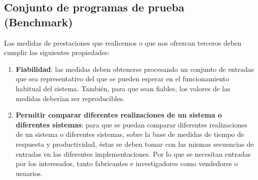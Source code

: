 \documentclass[10pt,a4paper,spanish]{report}
\begin{document}
\textcolor[rgb]{0.2,0.4,0.8}{\subsection{Conjunto de programas de prueba (Benchmark)}}

Las medidas de prestaciones que realicemos o que nos ofrezcan terceros deben cumplir las siguientes propiedades:
\begin{enumerate}[\color{azul}{\bf $\heartsuit$}]
  \item \textbf{\textcolor[rgb]{0.2,0.4,0.8}{Fiabilidad}}: las medidas deben obtenerse procesando un conjunto de entradas que sea representativo del que se pueden esperar en el funcionamiento habitual del sistema. También, para que sean fiables, los valores de las medidas deberían ser reproducibles. 
  \item \textbf{\textcolor[rgb]{0.2,0.4,0.8}{Permitir comparar diferentes realizaciones de un sistema o diferentes sistemas}}: para que se puedan comparar diferentes realizaciones de un sistema o diferentes sistemas, sobre la base de medidas de tiempo de respuesta y productividad, éstas se deben tomar con las mismas secuencias de entradas en las diferentes implementaciones. Por lo que se necesitan entradas por los interesados, tanto fabricantes e investigadores como vendedores o usuarios.
\end{enumerate}
\end{document}
